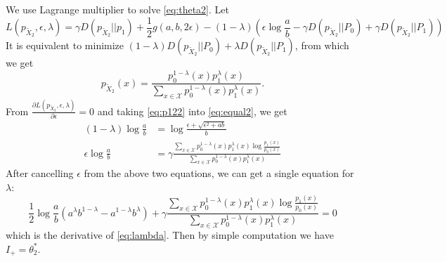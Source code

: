 \documentclass{article}
\begin{document}
We use Lagrange multiplier to solve \eqref{eq:theta2}.
Let
$$
L(p_{\widetilde{X}_2},\epsilon, \lambda)
=\gamma D(p_{\widetilde{X}_2}|| p_1)+ \frac{1}{2} g(a,b, 2\epsilon) - (1-\lambda)(\epsilon \log\frac{a}{b}-\gamma
D(p_{\widetilde{X}_2} || P_0) + \gamma D(p_{\widetilde{X}_2} || P_1))
$$
It is equivalent to minimize
$(1-\lambda)D(p_{\widetilde{X}_2} || P_0) +
\lambda D(p_{\widetilde{X}_2} || P_1) $, from
which we get
\begin{equation}\label{eq:p122}
p_{\widetilde{X}_2}(x) = \frac{p_0^{1-\lambda}(x)p_1^{\lambda}(x)}{\sum_{x \in \mathcal{X}}p_0^{1-\lambda}(x) p_1^{\lambda} (x)}.
\end{equation}
From $\frac{\partial L(p_{\widetilde{X}_2},\epsilon, \lambda)}{\partial \epsilon}=0$ and taking \eqref{eq:p122}
into \eqref{eq:equal2}, we get
\begin{align*}
    (1-\lambda) \log \frac{a}{b}
    & = \log \frac{\epsilon + \sqrt{\epsilon^2+ab}}{b} \\
    \epsilon \log \frac{a}{b}
    & = \gamma\frac{\sum_{x \in \mathcal{X}}p_0^{1-\lambda}(x) p_1^{\lambda} (x)\log \frac{p_1(x)}{p_0(x)}}{\sum_{x \in \mathcal{X}}p_0^{1-\lambda}(x) p_1^{\lambda} (x)}
\end{align*}
After cancelling $\epsilon$
from the above two equations, we can get a single equation
for $\lambda$:
\begin{equation}
    \frac{1}{2}\log\frac{a}{b}
    (a^{\lambda} b^{1-\lambda}
    -a^{1-\lambda} b^{\lambda})
    + \gamma \frac{\sum_{x \in \mathcal{X}}p_0^{1-\lambda}(x) p_1^{\lambda} (x)\log \frac{p_1(x)}{p_0(x)}}{\sum_{x \in \mathcal{X}}p_0^{1-\lambda}(x) p_1^{\lambda} (x)}=0
\end{equation}
which is the derivative of \eqref{eq:lambda}.
Then by simple computation we have
$I_+ = \theta_2^*$.
\end{document}
